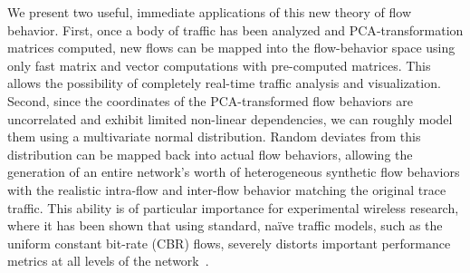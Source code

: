 \documentclass[conference]{IEEEtran}
\newcommand{\caps}[1]{{\small{#1}}}
\begin{document}
We present two useful, immediate applications of this new theory of flow behavior. First, once a body of traffic has been analyzed and \caps{PCA}-transformation matrices computed, new flows can be mapped into the flow-behavior space using only fast matrix and vector computations with pre-computed matrices. This allows the possibility of completely real-time traffic analysis and visualization.
%
Second, since the coordinates of the \caps{PCA}-transformed flow behaviors are uncorrelated and exhibit limited non-linear dependencies, we can roughly model them using a multivariate normal distribution. Random deviates from this distribution can be mapped back into actual flow behaviors, allowing the generation of an entire network's worth of heterogeneous synthetic flow behaviors with the realistic intra-flow and inter-flow behavior matching the original trace traffic. This ability is of particular importance for experimental wireless research, where it has been shown that using standard, na\"ive traffic models, such as the uniform constant bit-rate (\caps{CBR}) flows, severely distorts important performance metrics at all levels of the network~\cite{Karpinski07:realism,Karpinski07:cbr-failure}.





\end{document}

